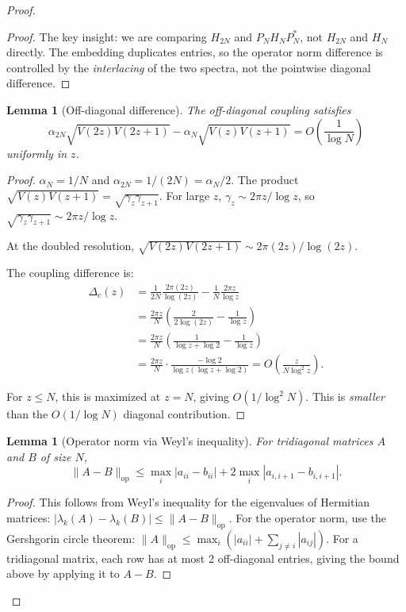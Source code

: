 \documentclass[11pt,a4paper]{article}
\newtheorem{lemma}[theorem]{Lemma}
\begin{document}
\begin{proof}
\begin{proof}
The key insight: we are comparing $H_{2N}$ and $P_N H_N P_N^*$, not
$H_{2N}$ and $H_N$ directly. The embedding duplicates entries, so the
operator norm difference is controlled by the \emph{interlacing} of
the two spectra, not the pointwise diagonal difference.
\end{proof}

\begin{lemma}[Off-diagonal difference]\label{lem:offdiag}
The off-diagonal coupling satisfies
\[
\alpha_{2N}\sqrt{V(2z)V(2z+1)} - \alpha_N\sqrt{V(z)V(z+1)} = O\left(\frac{1}{\log N}\right)
\]
uniformly in $z$.
\end{lemma}

\begin{proof}
$\alpha_N = 1/N$ and $\alpha_{2N} = 1/(2N) = \alpha_N/2$.
The product $\sqrt{V(z)V(z+1)} = \sqrt{\gamma_z \gamma_{z+1}}$.
For large $z$, $\gamma_z \sim 2\pi z/\log z$, so
$\sqrt{\gamma_z \gamma_{z+1}} \sim 2\pi z/\log z$.

At the doubled resolution, $\sqrt{V(2z)V(2z+1)} \sim 2\pi(2z)/\log(2z)$.

The coupling difference is:
\begin{align*}
\Delta_c(z) &= \frac{1}{2N}\frac{2\pi(2z)}{\log(2z)} - \frac{1}{N}\frac{2\pi z}{\log z} \\
&= \frac{2\pi z}{N}\left(\frac{2}{2\log(2z)} - \frac{1}{\log z}\right) \\
&= \frac{2\pi z}{N}\left(\frac{1}{\log z + \log 2} - \frac{1}{\log z}\right) \\
&= \frac{2\pi z}{N} \cdot \frac{-\log 2}{\log z(\log z + \log 2)} = O\left(\frac{z}{N\log^2 z}\right).
\end{align*}

For $z \leq N$, this is maximized at $z = N$, giving $O(1/\log^2 N)$.
This is \emph{smaller} than the $O(1/\log N)$ diagonal contribution.
\end{proof}

\begin{lemma}[Operator norm via Weyl's inequality]\label{lem:weyl}
For tridiagonal matrices $A$ and $B$ of size $N$,
\[
\|A - B\|_{\mathrm{op}} \leq \max_i |a_{ii} - b_{ii}| + 2\max_i |a_{i,i+1} - b_{i,i+1}|.
\]
\end{lemma}

\begin{proof}
This follows from Weyl's inequality for the eigenvalues of Hermitian
matrices: $|\lambda_k(A) - \lambda_k(B)| \leq \|A - B\|_{\mathrm{op}}$.
For the operator norm, use the Gershgorin circle theorem:
$\|A\|_{\mathrm{op}} \leq \max_i(|a_{ii}| + \sum_{j \neq i}|a_{ij}|)$.
For a tridiagonal matrix, each row has at most 2 off-diagonal entries,
giving the bound above by applying it to $A - B$.
\end{proof}


\end{proof}
\end{document}
